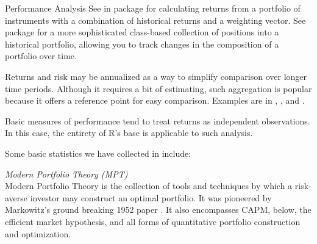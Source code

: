 \documentclass[12pt,letterpaper,english]{article}
\begin{document}
\begin{Section}{Performance Analysis}
See  in package  for calculating returns from a portfolio of instruments with a combination of historical returns and a weighting vector.  See package  for a more sophisticated class-based collection of positions into a historical portfolio, allowing you to track changes in the composition of a portfolio over time.

Returns and risk may be annualized as a way to simplify comparison over longer time periods.  Although it requires a bit of estimating, such aggregation is popular because it offers a reference point for easy comparison.  Examples are in , , and .

Basic measures of performance tend to treat returns as independent observations.  In this case, the entirety of R's base is applicable to such analysis.

Some basic statistics we have collected in  include:
\\

\emph{Modern Portfolio Theory (MPT)} \\
Modern Portfolio Theory is the collection of tools and techniques by which a risk-averse investor may construct an optimal portfolio.  It was pioneered by Markowitz's ground breaking 1952 paper \Cite{Portfolio Selection}.  It also encompasses CAPM, below, the efficient market hypothesis, and all forms of quantitative portfolio construction and optimization.


\end{Section}
\end{document}
